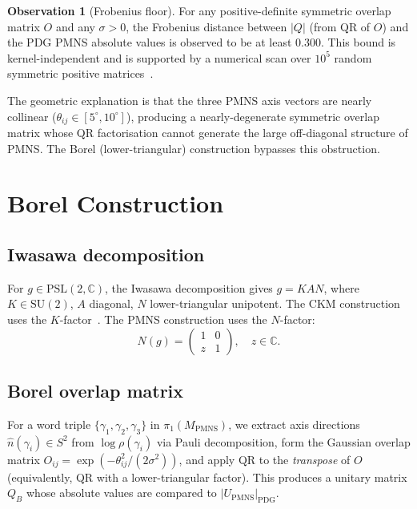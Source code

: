 \documentclass[11pt,a4paper]{article}
\theoremstyle{definition}
\newtheorem{observation}[theorem]{Observation}
\newcommand{\MPMNS}{M_{\mathrm{PMNS}}}
\newcommand{\PSL}{\mathrm{PSL}(2,\mathbb{C})}
\begin{document}
\begin{observation}[Frobenius floor]
\label{obs:floor}
For any positive-definite symmetric overlap matrix $O$ and any
$\sigma>0$, the Frobenius distance between $|Q|$ (from QR of $O$)
and the PDG PMNS absolute values is observed to be at least $0.300$.
This bound is kernel-independent and is supported by a numerical
scan over $10^5$ random symmetric positive matrices~\cite{Gentry:PMNS_arxiv}.
\end{observation}

The geometric explanation is that the three PMNS axis vectors are
nearly collinear ($\theta_{ij}\in[5^\circ,10^\circ]$), producing
a nearly-degenerate symmetric overlap matrix whose QR factorisation
cannot generate the large off-diagonal structure of PMNS.
The Borel (lower-triangular) construction bypasses this obstruction.

\section{Borel Construction}
\label{sec:borel}

\subsection{Iwasawa decomposition}

For $g\in\PSL$, the Iwasawa decomposition gives $g=KAN$, where
$K\in\mathrm{SU}(2)$, $A$ diagonal, $N$ lower-triangular unipotent.
The CKM construction uses the $K$-factor~\cite{Gentry:CKM}.
The PMNS construction uses the $N$-factor:
\[
  N(g) = \begin{pmatrix} 1 & 0 \\ z & 1 \end{pmatrix},
  \quad z\in\mathbb{C}.
\]

\subsection{Borel overlap matrix}

For a word triple $\{\gamma_1,\gamma_2,\gamma_3\}$ in
$\pi_1(\MPMNS)$, we extract axis directions $\hat{n}(\gamma_i)\in S^2$
from $\log\rho(\gamma_i)$ via Pauli decomposition, form the Gaussian
overlap matrix $O_{ij}=\exp(-\theta_{ij}^2/(2\sigma^2))$, and apply
QR to the \emph{transpose} of $O$ (equivalently, QR with a
lower-triangular factor). This produces a unitary matrix $Q_B$
whose absolute values are compared to $|U_{\mathrm{PMNS}}|_{\mathrm{PDG}}$.
\end{document}
